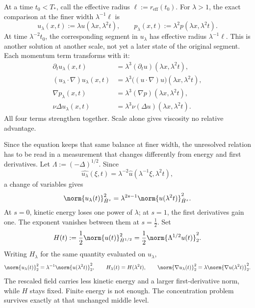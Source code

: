 
At a time \(t_0<T_*\), call the effective radius \(\ell:=r_{\mathrm{eff}}(t_0)\). For \(\lambda>1\), the exact \NavierStokes{} comparison at the finer width \(\lambda^{-1}\ell\) is
\[
  u_\lambda(x,t)
  :=
  \lambda u(\lambda x,\lambda^2t),
  \qquad
  p_\lambda(x,t)
  :=
  \lambda^2p(\lambda x,\lambda^2t).
\]
At time \(\lambda^{-2}t_0\), the corresponding segment in \(u_\lambda\) has effective radius \(\lambda^{-1}\ell\). This is another solution at another scale, not yet a later state of the original segment. Each momentum term transforms with it:
\[
\begin{aligned}
  \partial_tu_\lambda(x,t)
  &=
  \lambda^3(\partial_tu)(\lambda x,\lambda^2t),
  \\
  (u_\lambda\cdot\nabla)u_\lambda(x,t)
  &=
  \lambda^3\bigl((u\cdot\nabla)u\bigr)(\lambda x,\lambda^2t),
  \\
  \nabla p_\lambda(x,t)
  &=
  \lambda^3(\nabla p)(\lambda x,\lambda^2t),
  \\
  \nu\Delta u_\lambda(x,t)
  &=
  \lambda^3\nu(\Delta u)(\lambda x,\lambda^2t).
\end{aligned}
\]
All four terms strengthen together. Scale alone gives viscosity no relative advantage.


Since the equation keeps that same balance at finer width, the unresolved relation has to be read in a measurement that changes differently from energy and first derivatives. Let \(\Lambda:=(-\Delta)^{1/2}\). Since
\[
  \widehat{u_\lambda}(\xi,t)
  =
  \lambda^{-2}\widehat u(\lambda^{-1}\xi,\lambda^2t),
\]
a change of variables gives
\[
  \norm{u_\lambda(t)}_{\dot H^s}^2
  =
  \lambda^{2s-1}
  \norm{u(\lambda^2t)}_{\dot H^s}^2.
\]
At \(s=0\), kinetic energy loses one power of \(\lambda\); at \(s=1\), the first derivatives gain one. The exponent vanishes between them at \(s=\tfrac12\). Set
\[
  H(t)
  :=
  \frac12\norm{u(t)}_{\dot H^{1/2}}^2
  =
  \frac12\norm{\Lambda^{1/2}u(t)}_2^2.
\]
Writing \(H_\lambda\) for the same quantity evaluated on \(u_\lambda\),
\[
  \norm{u_\lambda(t)}_2^2
  =
  \lambda^{-1}\norm{u(\lambda^2t)}_2^2,
  \qquad
  H_\lambda(t)=H(\lambda^2t),
  \qquad
  \norm{\nabla u_\lambda(t)}_2^2
  =
  \lambda\norm{\nabla u(\lambda^2t)}_2^2.
\]
The rescaled field carries less kinetic energy and a larger first-derivative norm, while \(H\) stays fixed. Finite energy is not enough. The concentration problem survives exactly at that unchanged middle level.

